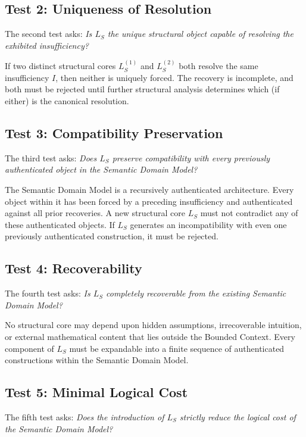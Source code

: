 \documentclass[12pt,openany]{extbook}
\theoremstyle{plain}
\theoremstyle{definition}
\begin{document}
\subsection{Test 2: Uniqueness of Resolution}

The second test asks: \emph{Is $L_S$ the unique structural object capable of resolving the exhibited insufficiency?}

If two distinct structural cores $L_S^{(1)}$ and $L_S^{(2)}$ both resolve the same insufficiency $I$, then neither is uniquely forced. The recovery is incomplete, and both must be rejected until further structural analysis determines which (if either) is the canonical resolution.

\subsection{Test 3: Compatibility Preservation}

The third test asks: \emph{Does $L_S$ preserve compatibility with every previously authenticated object in the Semantic Domain Model?}

The Semantic Domain Model is a recursively authenticated architecture. Every object within it has been forced by a preceding insufficiency and authenticated against all prior recoveries. A new structural core $L_S$ must not contradict any of these authenticated objects. If $L_S$ generates an incompatibility with even one previously authenticated construction, it must be rejected.

\subsection{Test 4: Recoverability}

The fourth test asks: \emph{Is $L_S$ completely recoverable from the existing Semantic Domain Model?}

No structural core may depend upon hidden assumptions, irrecoverable intuition, or external mathematical content that lies outside the Bounded Context. Every component of $L_S$ must be expandable into a finite sequence of authenticated constructions within the Semantic Domain Model.

\subsection{Test 5: Minimal Logical Cost}

The fifth test asks: \emph{Does the introduction of $L_S$ strictly reduce the logical cost of the Semantic Domain Model?}
\end{document}
